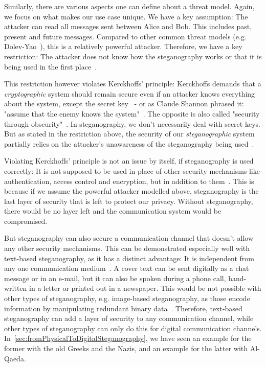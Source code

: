 Similarly, there are various aspects one can define about a threat model. Again, we focus on what makes our use case unique. We have a key assumption: The attacker can read all messages sent between Alice and Bob. This includes past, present and future messages. Compared to other common threat models (e.g. Dolev-Yao~\cite{dolevSecurityPublicKey1983}), this is a relatively powerful attacker. Therefore, we have a key restriction: The attacker does not know how the steganography works or that it is being used in the first place~\cite{al-aniOverviewMainFundamentals2010}.

This restriction however violates Kerckhoffs' principle: Kerckhoffs demands that a \textit{cryptographic} system should remain secure even if an attacker knows everything about the system, except the secret key~\cite{andersonLimitsSteganography1998,smithEffectiveSecurityObscurity2022} - or as Claude Shannon phrased it: "assume that the enemy knows the system"~\cite{shannonCommunicationTheorySecrecy1949}. The opposite is also called "security through obscurity"~\cite{smithEffectiveSecurityObscurity2022}. In steganography, we don't necessarily deal with secret keys. But as stated in the restriction above, the security of our \textit{steganographic} system partially relies on the attacker's unawareness of the steganography being used~\cite{al-aniOverviewMainFundamentals2010}.

Violating Kerckhoffs' principle is not an issue by itself, if steganography is used correctly: It is not supposed to be used in place of other security mechanisms like authentication, access control and encryption, but in addition to them~\cite{al-aniOverviewMainFundamentals2010}. This is because if we assume the powerful attacker modelled above, steganography is the last layer of security that is left to protect our privacy. Without steganography, there would be no layer left and the communication system would be compromised.

But steganography can also secure a communication channel that doesn't allow any other security mechanisms. This can be demonstrated especially well with text-based steganography, as it has a distinct advantage: It is independent from any one communication medium~\cite{zieglerNeuralLinguisticSteganography2019}. A cover text can be sent digitally as a chat message or in an e-mail, but it can also be spoken during a phone call, hand-written in a letter or printed out in a newspaper. This would be not possible with other types of steganography, e.g. image-based steganography, as those encode information by manipulating redundant binary data~\cite{bennettLinguisticSteganographySurvey2004}. Therefore, text-based steganography can add a layer of security to any communication channel, while other types of steganography can only do this for digital communication channels. In~\cref{sec:fromPhysicalToDigitalSteganography}, we have seen an example for the former with the old Greeks and the Nazis, and an example for the latter with Al-Qaeda.

